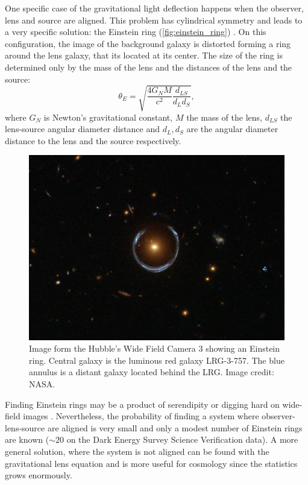 One specific case of the gravitational light deflection happens when the observer, lens and source are aligned. This problem has cylindrical symmetry and leads to a very specific solution: the Einstein ring (\autoref{fig:einstein_ring}) \cite{2016ApJ...827...51N}. On this configuration, the image of the background galaxy is distorted forming a ring around the lens galaxy, that its located at its center. The size of the ring is determined only by the mass of the lens and the distances of the lens and the source:
\begin{equation}
\theta_E = \sqrt{\frac{4G_NM}{c^2}\frac{d_{LS}}{d_Ld_S}},
\end{equation}
where $G_N$ is Newton's gravitational constant, $M$ the mass of the lens, $d_{LS}$ the lens-source angular diameter distance and $d_L,d_S$ are the angular diameter distance to the lens and the source respectively.
\begin{figure}
\begin{center}
\includegraphics[width=\textwidth]{./Pictures/einstein_ring.jpg}
\caption{Image form the Hubble's Wide Field Camera 3 showing an Einstein ring. Central galaxy is the luminous red galaxy LRG-3-757. The blue annulus is a distant galaxy located behind the LRG. Image credit: NASA.}
\label{fig:einstein_ring}
\end{center}
\end{figure}
\newline

Finding Einstein rings may be a product of serendipity or digging hard on wide-field images \cite{2017arXiv170402744J}. Nevertheless, the probability of finding a system where observer-lens-source are aligned is very small and only a modest number of Einstein rings are known ($\sim20$ on the Dark Energy Survey Science Verification data). A more general solution, where the system is not aligned can be found with the gravitational lens equation and is more useful for cosmology since the statistics grows enormously.


